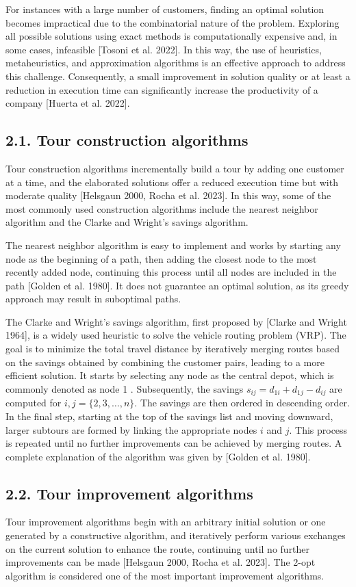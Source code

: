 \documentclass[10pt]{article}
\begin{document}
For instances with a large number of customers, finding an optimal solution becomes impractical due to the combinatorial nature of the problem. Exploring all possible solutions using exact methods is computationally expensive and, in some cases, infeasible [Tosoni et al. 2022]. In this way, the use of heuristics, metaheuristics, and approximation algorithms is an effective approach to address this challenge. Consequently, a small improvement in solution quality or at least a reduction in execution time can significantly increase the productivity of a company [Huerta et al. 2022].

\subsection*{2.1. Tour construction algorithms}
Tour construction algorithms incrementally build a tour by adding one customer at a time, and the elaborated solutions offer a reduced execution time but with moderate quality [Helsgaun 2000, Rocha et al. 2023]. In this way, some of the most commonly used construction algorithms include the nearest neighbor algorithm and the Clarke and Wright's savings algorithm.

The nearest neighbor algorithm is easy to implement and works by starting any node as the beginning of a path, then adding the closest node to the most recently added node, continuing this process until all nodes are included in the path [Golden et al. 1980]. It does not guarantee an optimal solution, as its greedy approach may result in suboptimal paths.

The Clarke and Wright's savings algorithm, first proposed by [Clarke and Wright 1964], is a widely used heuristic to solve the vehicle routing problem (VRP). The goal is to minimize the total travel distance by iteratively merging routes based on the savings obtained by combining the customer pairs, leading to a more efficient solution. It starts by selecting any node as the central depot, which is commonly denoted as node 1 . Subsequently, the savings $s_{i j}=d_{1 i}+d_{1 j}-d_{i j}$ are computed for $i, j=\{2,3, \ldots, n\}$. The savings are then ordered in descending order. In the final step, starting at the top of the savings list and moving downward, larger subtours are formed by linking the appropriate nodes $i$ and $j$. This process is repeated until no further improvements can be achieved by merging routes. A complete explanation of the algorithm was given by [Golden et al. 1980].

\subsection*{2.2. Tour improvement algorithms}
Tour improvement algorithms begin with an arbitrary initial solution or one generated by a constructive algorithm, and iteratively perform various exchanges on the current solution to enhance the route, continuing until no further improvements can be made [Helsgaun 2000, Rocha et al. 2023]. The 2-opt algorithm is considered one of the most important improvement algorithms.
\end{document}
